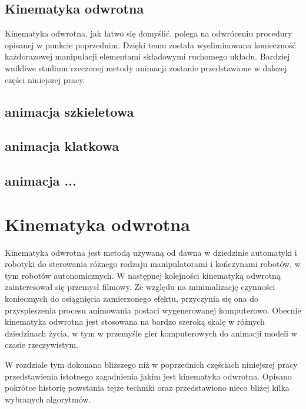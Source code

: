 \documentclass[11pt]{mwrep}
\begin{document}
\section{Kinematyka odwrotna}

 Kinematyka odwrotna, jak łatwo się domyślić, polega na odwróceniu procedury opisanej w punkcie poprzednim. Dzięki temu została wyeliminowana konieczność każdorazowej manipulacji elementami składowymi ruchomego układu. Bardziej wnikliwe studium rzeczonej metody animacji zostanie przedstawione w dalszej części niniejszej pracy.

  \section{animacja szkieletowa}
  \section{animacja klatkowa}
  \section{animacja ...}
  
\chapter{Kinematyka odwrotna}

 Kinematyka odwrotna jest metodą używaną od dawna w dziedzinie automatyki i robotyki do sterowania różnego rodzaju manipulatorami i kończynami robotów, w tym robotów autonomicznych. W następnej kolejności kinematyką odwrotną zainteresował się przemysł filmowy. Ze względu na minimalizację czynności koniecznych do osiągnięcia zamierzonego efektu, przyczynia się ona do przyspieszenia procesu animowania postaci wygenerowanej komputerowo. Obecnie kinematyka odwrotna jest stosowana na bardzo szeroką skalę w różnych dziedzinach życia, w tym w przemyśle gier komputerowych do animacji modeli w czasie rzeczywistym.
 
W rozdziale tym dokonano bliższego niż w poprzednich częściach niniejszej pracy przedstawienia istotnego zagadnienia jakim jest kinematyka odwrotna. Opisano pokrótce historię powstania tejże techniki oraz przedstawiono nieco bliżej kilka wybranych algorytmów.

\end{document}
